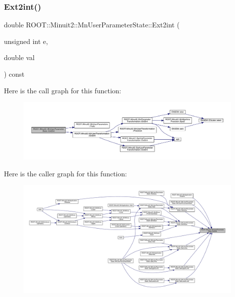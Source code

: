 \subsubsection{\texorpdfstring{Ext2int()}{Ext2int()}\hspace{0.1cm}{\footnotesize\ttfamily [1/2]}}
{\footnotesize\ttfamily double R\+O\+O\+T\+::\+Minuit2\+::\+Mn\+User\+Parameter\+State\+::\+Ext2int (\begin{DoxyParamCaption}\item[{unsigned int}]{e,  }\item[{double}]{val }\end{DoxyParamCaption}) const}

Here is the call graph for this function\+:\nopagebreak
\begin{figure}[H]
\begin{center}
\leavevmode
\includegraphics[width=350pt]{d3/de0/classROOT_1_1Minuit2_1_1MnUserParameterState_a8e0b79e3a150b2ccd15678755b1adb4a_cgraph}
\end{center}
\end{figure}
Here is the caller graph for this function\+:\nopagebreak
\begin{figure}[H]
\begin{center}
\leavevmode
\includegraphics[width=350pt]{d3/de0/classROOT_1_1Minuit2_1_1MnUserParameterState_a8e0b79e3a150b2ccd15678755b1adb4a_icgraph}
\end{center}
\end{figure}
\mbox{\label{classROOT_1_1Minuit2_1_1MnUserParameterState_a8e0b79e3a150b2ccd15678755b1adb4a}} 
